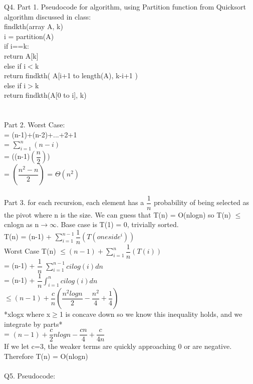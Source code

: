 \documentclass[10pt,a4paper]{article}
\newcommand\tab[1][1cm]{\hspace*{#1}}
\begin{document}
Q4. Part 1. Pseudocode for algorithm, using Partition function from Quicksort algorithm discussed in class:\\
findkth(array A, k){\\
 \tab  i = partition(A) \\
 \tab  if i==k: \\
   		\tab \tab return A[k]\\
  \tab 	else if i$<$k\\
   	\tab \tab	return findkth( A[i+1 to length(A), k-i+1 ) \\
   \tab	else if i$>$k\\
   	\tab \tab	return findkth(A[0 to i], k)\\
   		}\\ 
   		\\
	Part 2. Worst Case: \\
	= (n-1)+(n-2)+...+2+1 \\
	= $\sum_{i=1}^{n} (n-i)$ \\
	= ((n-1)$(\dfrac{n}{2})$) \\
	= $(\dfrac{n^{2}-n}{2})$
	= $\Theta(n^{2})$ \\
	\\
	Part 3. for each recursion, each element has a $\dfrac{1}{n}$ probability of being selected as the pivot where n is the size. We can guess that T(n) = O(nlogn) so T(n) $\leq$ cnlogn as n$\rightarrow\infty$. Base case is T(1) = 0, trivially sorted.\\
	T(n) = (n-1) + $\sum_{i=1}^{n-1} \dfrac{1}{n}(T(oneside^{i})) $ \\
	Worst Case T(n) $\leq (n-1) + \sum_{i=1}^{n} \dfrac{1}{n}(T(i))$ \\
	= (n-1) + $\dfrac{1}{n}$ $\sum_{i=1}^{n-1}cilog(i)dn$\\
	= (n-1) + $\dfrac{1}{n} \int_{i=1}^{n} cilog(i)dn $ \\
	$\leq (n-1) + \dfrac{c}{n}(\dfrac{n^{2}logn}{2}-\dfrac{n^{2}}{4}+\dfrac{1}{4})$ \\    *xlogx where x$\geq$1 is concave down so we know this inequality holds, and we integrate by parts* \\
	= $(n-1) + \dfrac{c}{2}nlogn - \dfrac{cn}{4} + \dfrac{c}{4n}$ \\
	If we let c=3, the weaker terms are quickly approaching 0 or are negative. Therefore T(n) = O(nlogn) 
	\\
	\\
	Q5. Pseudocode: \\
\end{document}
